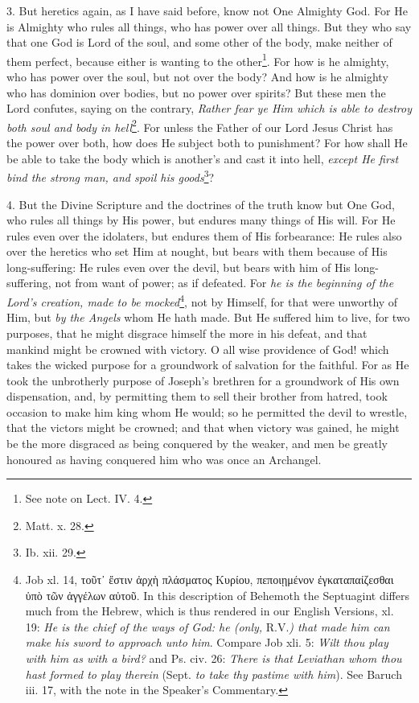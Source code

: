 3. But heretics again, as I have said before, know not One Almighty God. For He is Almighty who rules all things, who has power over all things. But they who say that one God is Lord of the soul, and some other of the body, make neither of them perfect, because either is wanting to the other\footnote{See note on Lect. IV. 4.}. For how is he almighty, who has power over the soul, but not over the body? And how is he almighty who has dominion over bodies, but no power over spirits? But these men the Lord confutes, saying on the contrary, \emph{Rather fear ye Him which is able to destroy both soul and body in hell}\footnote{Matt. x. 28.}. For unless the Father of our Lord Jesus Christ has the power over both, how does He subject both to punishment? For how shall He be able to take the body which is another’s and cast it into hell, \emph{except He first bind the strong man, and spoil his goods}\footnote{Ib. xii. 29.}?

4. But the Divine Scripture and the doctrines of the truth know but One God, who rules all things by His power, but endures many things of His will. For He rules even over the idolaters, but endures them of His forbearance: He rules also over the heretics who set Him at nought, but bears with them because of His long-suffering: He rules even over the devil, but bears with him of His long-suffering, not from want of power; as if defeated. For \emph{he is the beginning of the Lord’s creation, made to be mocked}\footnote{Job xl. 14, \textgreek{τοῦτ᾽ ἔστιν ἀρχὴ πλάσματος Κυρίου, πεποιῃμένον ἐγκαταπαίζεσθαι ὑπὸ τῶν ἀγγέλων αὐτοῦ}. In this description of Behemoth the Septuagint differs much from the Hebrew, which is thus rendered in our English Versions, xl. 19: \emph{He is the chief of the ways of God: he (only,} R.V.\emph{) that made him can make his sword to approach unto him}. Compare Job xli. 5: \emph{Wilt thou play with him as with a bird?} and Ps. civ. 26: \emph{There is that Leviathan whom thou hast formed to play therein} (Sept. \emph{to take thy pastime with him}). See Baruch iii. 17, with the note in the Speaker’s Commentary.}, not by Himself, for that were unworthy of Him, but \emph{by the Angels} whom He hath made. But He suffered him to live, for two purposes, that he might disgrace himself the more in his defeat, and that mankind might be crowned with victory. O all wise providence of God! which takes the wicked purpose for a groundwork of salvation for the faithful. For as He took the unbrotherly purpose of Joseph’s brethren for a groundwork of His own dispensation, and, by permitting them to sell their brother from hatred, took occasion to make him king whom He would; so he permitted the devil to wrestle, that the victors might be crowned; and that when victory was gained, he might be the more disgraced as being conquered by the weaker, and men be greatly honoured as having conquered him who was once an Archangel.

